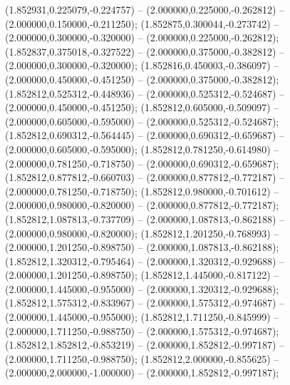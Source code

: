  (1.852931,0.225079,-0.224757) -- (2.000000,0.225000,-0.262812) -- (2.000000,0.150000,-0.211250);
 (1.852875,0.300044,-0.273742) -- (2.000000,0.300000,-0.320000) -- (2.000000,0.225000,-0.262812);
 (1.852837,0.375018,-0.327522) -- (2.000000,0.375000,-0.382812) -- (2.000000,0.300000,-0.320000);
 (1.852816,0.450003,-0.386097) -- (2.000000,0.450000,-0.451250) -- (2.000000,0.375000,-0.382812);
 (1.852812,0.525312,-0.448936) -- (2.000000,0.525312,-0.524687) -- (2.000000,0.450000,-0.451250);
 (1.852812,0.605000,-0.509097) -- (2.000000,0.605000,-0.595000) -- (2.000000,0.525312,-0.524687);
 (1.852812,0.690312,-0.564445) -- (2.000000,0.690312,-0.659687) -- (2.000000,0.605000,-0.595000);
 (1.852812,0.781250,-0.614980) -- (2.000000,0.781250,-0.718750) -- (2.000000,0.690312,-0.659687);
 (1.852812,0.877812,-0.660703) -- (2.000000,0.877812,-0.772187) -- (2.000000,0.781250,-0.718750);
 (1.852812,0.980000,-0.701612) -- (2.000000,0.980000,-0.820000) -- (2.000000,0.877812,-0.772187);
 (1.852812,1.087813,-0.737709) -- (2.000000,1.087813,-0.862188) -- (2.000000,0.980000,-0.820000);
 (1.852812,1.201250,-0.768993) -- (2.000000,1.201250,-0.898750) -- (2.000000,1.087813,-0.862188);
 (1.852812,1.320312,-0.795464) -- (2.000000,1.320312,-0.929688) -- (2.000000,1.201250,-0.898750);
 (1.852812,1.445000,-0.817122) -- (2.000000,1.445000,-0.955000) -- (2.000000,1.320312,-0.929688);
 (1.852812,1.575312,-0.833967) -- (2.000000,1.575312,-0.974687) -- (2.000000,1.445000,-0.955000);
 (1.852812,1.711250,-0.845999) -- (2.000000,1.711250,-0.988750) -- (2.000000,1.575312,-0.974687);
 (1.852812,1.852812,-0.853219) -- (2.000000,1.852812,-0.997187) -- (2.000000,1.711250,-0.988750);
 (1.852812,2.000000,-0.855625) -- (2.000000,2.000000,-1.000000) -- (2.000000,1.852812,-0.997187);
